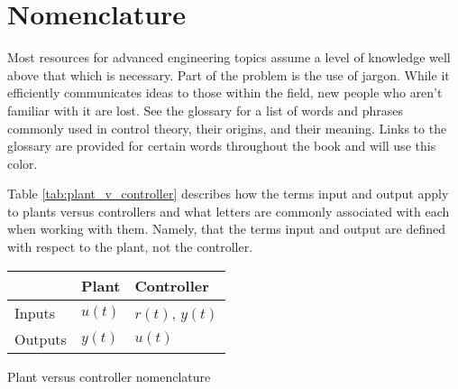 \section{Nomenclature}

Most resources for advanced engineering topics assume a level of knowledge well
above that which is necessary. Part of the problem is the use of jargon. While
it efficiently communicates ideas to those within the field, new people who
aren't familiar with it are lost. See the glossary for a list of words and
phrases commonly used in control theory, their origins, and their meaning. Links
to the glossary are provided for certain words throughout the book and will use
\textcolor{glscolor}{this color}.

Table \ref{tab:plant_v_controller} describes how the terms \gls{input} and
\gls{output} apply to \glspl{plant} versus \glspl{controller} and what letters
are commonly associated with each when working with them. Namely, that the terms
\gls{input} and \gls{output} are defined with respect to the \gls{plant}, not
the \gls{controller}.

\begin{booktable}
  \begin{tabular}{|l|ll|}
    \hline
    \rowcolor{headingbg}
    & \textbf{Plant} & \textbf{Controller} \\
    \hline
    Inputs & $u(t)$ & $r(t)$, $y(t)$ \\
    Outputs & $y(t)$ & $u(t)$ \\
    \hline
  \end{tabular}
  \caption{Plant versus controller nomenclature}
  \label{tab:plant_v_controller}
\end{booktable}
